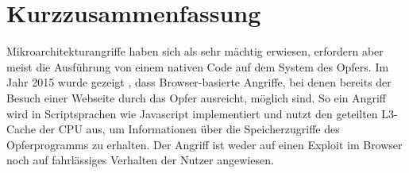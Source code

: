 \chapter*{Kurzzusammenfassung}


Mikroarchitekturangriffe haben sich als sehr mächtig erwiesen, erfordern aber meist die Ausführung von einem nativen Code auf dem System des Opfers.
Im Jahr 2015 wurde gezeigt  \cite{TheSpyInTheSandbox}, dass Browser-basierte Angriffe, bei denen bereits der Besuch einer Webseite durch das Opfer ausreicht, möglich sind.
So ein Angriff wird in Scriptsprachen wie Javascript implementiert und nutzt den geteilten L3-Cache der CPU aus, um Informationen über die Speicherzugriffe des Opferprogramms zu erhalten.
Der Angriff ist weder auf einen Exploit im Browser noch auf fahrlässiges Verhalten der Nutzer angewiesen.




